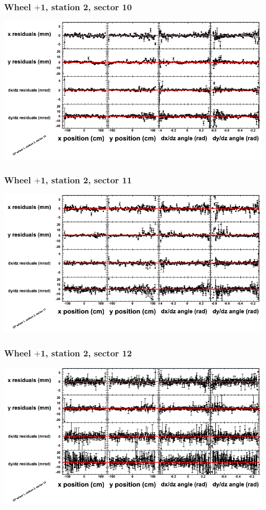 \documentclass[compress]{beamer}
\begin{document}
\begin{frame}
\frametitle{Wheel $+$1, station 2, sector 10}
\includegraphics[width=\linewidth]{tmppoly_MBwhDst2sec10.png}
\end{frame}

\begin{frame}
\frametitle{Wheel $+$1, station 2, sector 11}
\includegraphics[width=\linewidth]{tmppoly_MBwhDst2sec11.png}
\end{frame}

\begin{frame}
\frametitle{Wheel $+$1, station 2, sector 12}
\includegraphics[width=\linewidth]{tmppoly_MBwhDst2sec12.png}
\end{frame}
\end{document}
